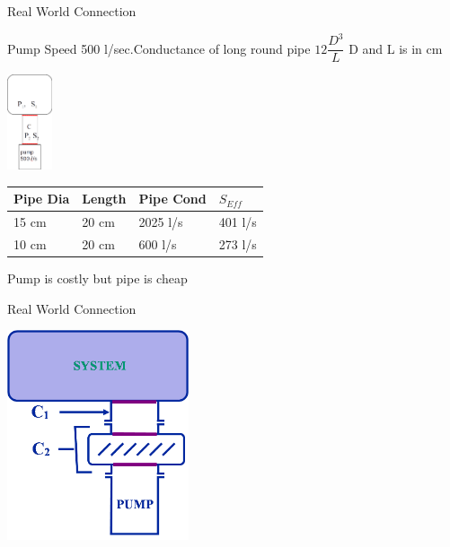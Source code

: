 \documentclass[11]{beamer}
\begin{document}
\begin{frame}{Real World Connection}

Pump Speed 500 l/sec.Conductance of long round pipe $ 12 \dfrac{D^3}{L}$ D and L is in cm
 \begin{center}
		
		\includegraphics[width=0.1\textwidth]{PumpPipe.png}
		
	\end{center}

\begin{center}
 	
 	
 	\begin{tabular}{ | l | l | l | l|}
    \hline
    Pipe Dia & Length & Pipe Cond  & $S_{Eff}$ \\ \hline
   
    15 cm
    & 20 cm 
    &  2025 l/s 
    & 401 l/s \\ \hline
	
	10 cm
    & 20 cm 
    &  600 l/s 
    & 273 l/s \\ \hline
    
    \end{tabular}
\end{center}	


\alert{Pump is costly but pipe is cheap}


\end{frame}




\begin{frame}{Real World Connection}

 \begin{center}
		
		\includegraphics[width=0.4\textwidth]{PumpVesselConnection.png}
		
	\end{center}




\end{frame}
\end{document}
